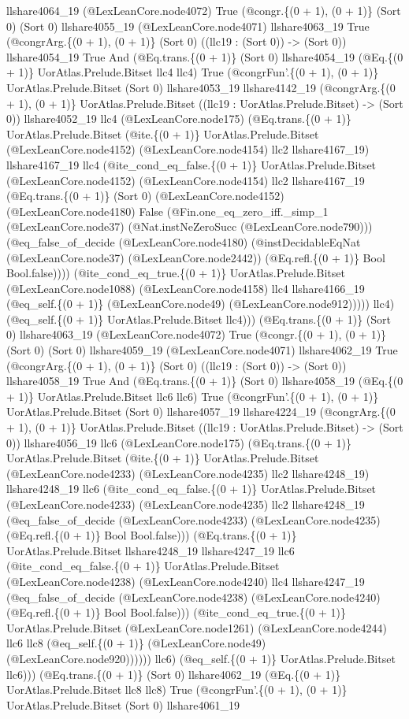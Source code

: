 \documentclass[11pt]{article}
\begin{document}
llshare4064\_19 (@LexLeanCore.node4072) True (@congr.\{(0 + 1), (0 + 1)\} (Sort 0) (Sort 0) llshare4055\_19 (@LexLeanCore.node4071) llshare4063\_19 True (@congrArg.\{(0 + 1), (0 + 1)\} (Sort 0) ((llc19 : (Sort 0)) -> (Sort 0)) llshare4054\_19 True And (@Eq.trans.\{(0 + 1)\} (Sort 0) llshare4054\_19 (@Eq.\{(0 + 1)\} UorAtlas.Prelude.Bitset llc4 llc4) True (@congrFun'.\{(0 + 1), (0 + 1)\} UorAtlas.Prelude.Bitset (Sort 0) llshare4053\_19 llshare4142\_19 (@congrArg.\{(0 + 1), (0 + 1)\} UorAtlas.Prelude.Bitset ((llc19 : UorAtlas.Prelude.Bitset) -> (Sort 0)) llshare4052\_19 llc4 (@LexLeanCore.node175) (@Eq.trans.\{(0 + 1)\} UorAtlas.Prelude.Bitset (@ite.\{(0 + 1)\} UorAtlas.Prelude.Bitset (@LexLeanCore.node4152) (@LexLeanCore.node4154) llc2 llshare4167\_19) llshare4167\_19 llc4 (@ite\_cond\_eq\_false.\{(0 + 1)\} UorAtlas.Prelude.Bitset (@LexLeanCore.node4152) (@LexLeanCore.node4154) llc2 llshare4167\_19 (@Eq.trans.\{(0 + 1)\} (Sort 0) (@LexLeanCore.node4152) (@LexLeanCore.node4180) False (@Fin.one\_eq\_zero\_iff.\_simp\_1 (@LexLeanCore.node37) (@Nat.instNeZeroSucc (@LexLeanCore.node790))) (@eq\_false\_of\_decide (@LexLeanCore.node4180) (@instDecidableEqNat (@LexLeanCore.node37) (@LexLeanCore.node2442)) (@Eq.refl.\{(0 + 1)\} Bool Bool.false)))) (@ite\_cond\_eq\_true.\{(0 + 1)\} UorAtlas.Prelude.Bitset (@LexLeanCore.node1088) (@LexLeanCore.node4158) llc4 llshare4166\_19 (@eq\_self.\{(0 + 1)\} (@LexLeanCore.node49) (@LexLeanCore.node912))))) llc4) (@eq\_self.\{(0 + 1)\} UorAtlas.Prelude.Bitset llc4))) (@Eq.trans.\{(0 + 1)\} (Sort 0) llshare4063\_19 (@LexLeanCore.node4072) True (@congr.\{(0 + 1), (0 + 1)\} (Sort 0) (Sort 0) llshare4059\_19 (@LexLeanCore.node4071) llshare4062\_19 True (@congrArg.\{(0 + 1), (0 + 1)\} (Sort 0) ((llc19 : (Sort 0)) -> (Sort 0)) llshare4058\_19 True And (@Eq.trans.\{(0 + 1)\} (Sort 0) llshare4058\_19 (@Eq.\{(0 + 1)\} UorAtlas.Prelude.Bitset llc6 llc6) True (@congrFun'.\{(0 + 1), (0 + 1)\} UorAtlas.Prelude.Bitset (Sort 0) llshare4057\_19 llshare4224\_19 (@congrArg.\{(0 + 1), (0 + 1)\} UorAtlas.Prelude.Bitset ((llc19 : UorAtlas.Prelude.Bitset) -> (Sort 0)) llshare4056\_19 llc6 (@LexLeanCore.node175) (@Eq.trans.\{(0 + 1)\} UorAtlas.Prelude.Bitset (@ite.\{(0 + 1)\} UorAtlas.Prelude.Bitset (@LexLeanCore.node4233) (@LexLeanCore.node4235) llc2 llshare4248\_19) llshare4248\_19 llc6 (@ite\_cond\_eq\_false.\{(0 + 1)\} UorAtlas.Prelude.Bitset (@LexLeanCore.node4233) (@LexLeanCore.node4235) llc2 llshare4248\_19 (@eq\_false\_of\_decide (@LexLeanCore.node4233) (@LexLeanCore.node4235) (@Eq.refl.\{(0 + 1)\} Bool Bool.false))) (@Eq.trans.\{(0 + 1)\} UorAtlas.Prelude.Bitset llshare4248\_19 llshare4247\_19 llc6 (@ite\_cond\_eq\_false.\{(0 + 1)\} UorAtlas.Prelude.Bitset (@LexLeanCore.node4238) (@LexLeanCore.node4240) llc4 llshare4247\_19 (@eq\_false\_of\_decide (@LexLeanCore.node4238) (@LexLeanCore.node4240) (@Eq.refl.\{(0 + 1)\} Bool Bool.false))) (@ite\_cond\_eq\_true.\{(0 + 1)\} UorAtlas.Prelude.Bitset (@LexLeanCore.node1261) (@LexLeanCore.node4244) llc6 llc8 (@eq\_self.\{(0 + 1)\} (@LexLeanCore.node49) (@LexLeanCore.node920)))))) llc6) (@eq\_self.\{(0 + 1)\} UorAtlas.Prelude.Bitset llc6))) (@Eq.trans.\{(0 + 1)\} (Sort 0) llshare4062\_19 (@Eq.\{(0 + 1)\} UorAtlas.Prelude.Bitset llc8 llc8) True (@congrFun'.\{(0 + 1), (0 + 1)\} UorAtlas.Prelude.Bitset (Sort 0) llshare4061\_19 
\end{document}
